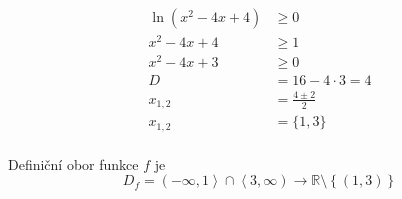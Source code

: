 
\begin{align}
	\ln{(x^2 - 4x + 4)} &\geq 0	\\
	x^2 - 4x + 4 &\geq 1 \\
	x^2 - 4x + 3 &\geq 0 \\
	D &= 16 - 4 \cdot 3 = 4 \\
	x_{1,2} &= \frac{4 \pm 2}{2} \\
	x_{1,2} &= \{1, 3\} \\
\end{align}

Definiční obor funkce $f$ je
\[ 
	D_f = \left( -\infty, 1 \right> \cap \left< 3, \infty \right) 
	\rightarrow \mathbb{R} \setminus \left\{ \left( 1,3 \right) \right\}   
\] 

